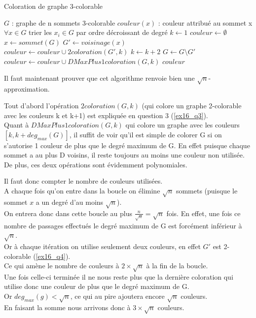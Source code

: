 \begin{center}
\begin{algorithm}[H]
\caption{Coloration de graphe 3-colorable}\label{ex16_algo1}
\begin{algorithmic}[1]
\REQUIRE $G$ : graphe de n sommets 3-colorable
\ENSURE $couleur(x)$ : couleur attribu\'e au sommet x $\forall x \in G$ 
	\STATE trier les $x_i \in G$ par ordre d\'ecroissant de degr\'e
	\STATE $k \leftarrow 1$
	\STATE $couleur \leftarrow \emptyset$
	\REPEAT
		\STATE $x \leftarrow sommet(G)$
		\STATE $G' \leftarrow voisinage(x)$
		\STATE $couleur \leftarrow couleur \cup 2coloration(G',k)$
		\STATE $k \leftarrow k+2$
		\STATE $G \leftarrow G \setminus G'$
	\STATE $couleur \leftarrow couleur \cup DMaxPlus1coloration(G,k)$
\RETURN $couleur$
\end{algorithmic}
\end{algorithm}
\end{center}

Il faut maintenant prouver que cet algorithme renvoie bien une $\sqrt{n}$-approximation.

Tout d'abord l'op\'eration $2coloration(G,k)$ (qui colore un graphe 2-colorable avec
les couleurs k et k+1) est expliqu\'ee en question 3 (\ref{ex16_q3}).\\
Quant \`a $DMaxPlus1coloration(G,k)$ qui colore un graphe avec les couleurs
$[k,k+deg_{max}(G)]$, il suffit de voir qu'il est simple de colorer G si on s'autorise 1
couleur de plus que le degr\'e maximum de G.
En effet puisque chaque sommet a au plus D voisins, il reste toujours au moins une
couleur non utilis\'ee.\\
De plus, ces deux op\'erations sont \'evidemment polynomiales.

Il faut donc compter le nombre de couleurs utilis\'ees.\\
A chaque fois qu'on entre dans la boucle on \'elimine $\sqrt{n}$ sommets (puisque le
sommet $x$ a un degr\'e d'au moins $\sqrt{n}$).\\
On entrera donc dans cette boucle au plus $\frac{n}{\sqrt{n}} = \sqrt{n}$ fois.
En effet, une fois ce nombre de passages effectu\'es le degr\'e maximum de G est
forc\'ement inf\'erieur \`a $\sqrt{n}$.\\
Or \`a chaque it\'eration on utilise seulement deux couleurs, en effet $G'$ est
2-colorable (\ref{ex16_q4}).\\
Ce qui am\`ene le nombre de couleurs \`a $2 \times \sqrt{n}$ \`a la fin de la boucle.\\
Une fois celle-ci termin\'ee il ne nous reste plus que la derni\`ere coloration qui
utilise donc une couleur de plus que le degr\'e maximum de G.\\
Or $deg_{max}(g) < \sqrt{n}$, ce qui au pire ajoutera encore $\sqrt{n}$ couleurs.\\
En faisant la somme nous arrivons donc \`a $3 \times \sqrt{n}$ couleurs.

